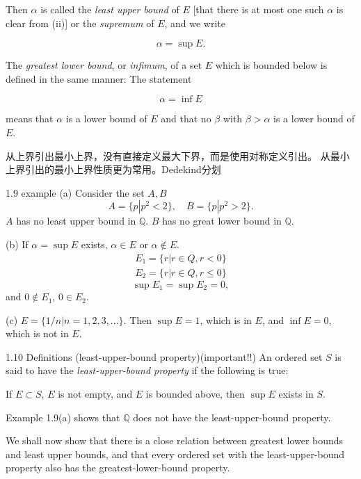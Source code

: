 Then $\alpha$ is called the \emph{least upper bound} of $E$ [that there is at most one such
$\alpha$ is clear from (ii)] or the \emph{supremum} of $E$, and we write

\begin{equation*}
    \alpha = \sup E.
\end{equation*}

The \emph{greatest lower bound}, or \emph{infimum}, of a set $E$ which is bounded below
is defined in the same manner: The statement

\begin{equation*}
    \alpha = \inf E
\end{equation*}

means that $\alpha$ is a lower bound of $E$ and that no $\beta$ with $\beta > \alpha$ is a lower bound
of $E$.

从上界引出最小上界，没有直接定义最大下界，而是使用对称定义引出。
从最小上界引出的最小上界性质更为常用。Dedekind分划

1.9 example
(a) Consider the set $A, B$
\begin{equation*}
    A = \{p|p^2 < 2\},\quad
    B = \{p|p^2 > 2\}.
\end{equation*}
$A$ has no least upper bound in $\mathbb{Q}$.
$B$ has no great lower bound in $\mathbb{Q}$.

(b) If $\alpha = \sup E$ exists, $\alpha\in E$ or $\alpha \notin E$.
\begin{align*}
    E_1 = \{r |r\in Q, r < 0\}\\
    E_2 = \{r |r\in Q, r \leq 0\}
\end{align*}
\begin{equation*}
    \sup E_1 = \sup E_2 = 0,
\end{equation*}
and $0\not\in E_1$, $0\in E_2$.

(c) $E = \{1/n | n = 1,2,3,...\}$. Then $\sup E = 1$, which is in $E$, and $\inf E = 0$, which is not in $E$.

1.10 Definitions (least-upper-bound property)(important!!)
An ordered set $S$ is said to have the \emph{least-upper-bound property}
if the following is true:

If $E \subset S$, $E$ is not empty, and $E$ is bounded above, then $\sup E$ exists in $S$.

Example 1.9(a) shows that $\mathbb{Q}$ does not have the least-upper-bound property.

We shall now show that there is a close relation between greatest lower
bounds and least upper bounds, and that every ordered set with the least-upper-bound property also has the greatest-lower-bound property.


